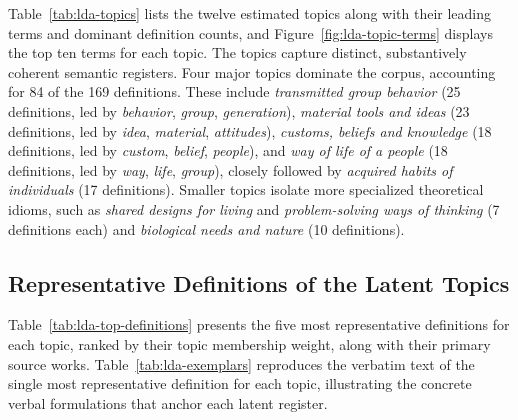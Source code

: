 \documentclass[11pt]{article}
\begin{document}
Table~\ref{tab:lda-topics} lists the twelve estimated topics along with their leading terms and dominant definition counts, and Figure~\ref{fig:lda-topic-terms} displays the top ten terms for each topic. The topics capture distinct, substantively coherent semantic registers. Four major topics dominate the corpus, accounting for 84 of the 169 definitions. These include \emph{transmitted group behavior} (25 definitions, led by \emph{behavior}, \emph{group}, \emph{generation}), \emph{material tools and ideas} (23 definitions, led by \emph{idea}, \emph{material}, \emph{attitudes}), \emph{customs, beliefs and knowledge} (18 definitions, led by \emph{custom}, \emph{belief}, \emph{people}), and \emph{way of life of a people} (18 definitions, led by \emph{way}, \emph{life}, \emph{group}), closely followed by \emph{acquired habits of individuals} (17 definitions). Smaller topics isolate more specialized theoretical idioms, such as \emph{shared designs for living} and \emph{problem-solving ways of thinking} (7 definitions each) and \emph{biological needs and nature} (10 definitions).

\subsection{Representative Definitions of the Latent Topics}

Table~\ref{tab:lda-top-definitions} presents the five most representative definitions for each topic, ranked by their topic membership weight, along with their primary source works. Table~\ref{tab:lda-exemplars} reproduces the verbatim text of the single most representative definition for each topic, illustrating the concrete verbal formulations that anchor each latent register.
\end{document}
